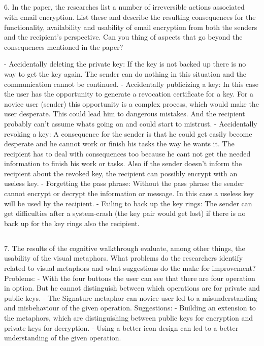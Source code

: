 \subsection{}
6. In the paper, the researches list a number of irreversible actions associated with email encryption. List these and describe the resulting consequences for the functionality, availability and usability of email encryption from both the senders and the recipient’s perspective. Can you thing of aspects that go beyond the consequences mentioned in the paper?

-	Accidentally deleting the private key: If the key is not backed up there is no way to get the key again. The sender can do nothing in this situation and the communication cannot be continued.
-	Accidentally publicizing a key: In this case the user has the opportunity to generate a revocation certificate for a key. For a novice user (sender) this opportunity is a complex process, which would make the user desperate. This could lead him to dangerous mistakes. And the recipient probably can’t assume whats going on and could start to mistrust.
-	Accidentally revoking a key: A consequence for the sender is that he could get easily become desperate and he cannot work or finish his tasks the way he wants it. The recipient has to deal with consequences too because he cant not get the needed information to finish his work or tasks. Also if the sender doesn’t inform the recipient about the revoked key, the recipient can possibly encrypt with an useless key.
-	Forgetting the pass phrase: Without the pass phrase the sender cannot encrypt or decrypt the information or message. In this case a useless key will be used by  the recipient. 
-	Failing to back up the key rings: The sender can get difficulties after a system-crash (the key pair would get lost) if there is no back up for the key rings also the recipient. 

\subsection{}
7. The results of the cognitive walkthrough evaluate, among other things, the usability of the visual metaphors. What problems do the researchers  identify related to visual metaphors and what suggestions do the make for improvement?
Problems:
-	With the four buttons the user can see that there are four operation in option. But he cannot distinguish between which operations are for private and public keys. 
-	The Signature metaphor can novice user led to a misunderstanding and misbehaviour of the given operation. 
Suggestions:
-	Building an extension to the metaphors, which are distinguishing between public keys for encryption and private keys for decryption.
-	Using a better icon design can led to a better understanding of the given operation. 

